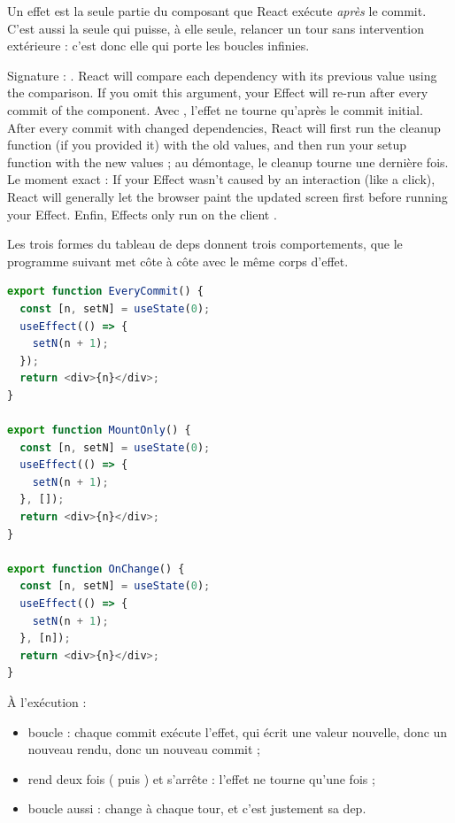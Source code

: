 Un effet est la seule partie du composant que React exécute \emph{après} le
commit. C'est aussi la seule qui puisse, à elle seule, relancer un tour sans
intervention extérieure : c'est donc elle qui porte les boucles infinies.

\begin{react}
Signature : . \og React will compare each
dependency with its previous value using the  comparison. If
you omit this argument, your Effect will re-run after every commit of the
component.\fg{} Avec \code{[]}, l'effet ne tourne qu'après le commit initial.
\og After every commit with changed dependencies, React will first run the
cleanup function (if you provided it) with the old values, and then run your
setup function with the new values\fg{} ; au démontage, le cleanup tourne une
dernière fois. Le moment exact : \og If your Effect wasn't caused by an
interaction (like a click), React will generally let the browser paint the
updated screen first before running your Effect.\fg{} Enfin, \og Effects only
run on the client\fg{} \cite{ReactDocs}.
\end{react}

Les trois formes du tableau de deps donnent trois comportements, que le
programme suivant met côte à côte avec le même corps d'effet.

\begin{lstlisting}[language=TypeScript,caption={Trois formes de deps pour le même effet (\file{/tmp/ch02/deps.tsx}, imports omis)},label={lst:react-modele-deps}]
export function EveryCommit() {
  const [n, setN] = useState(0);
  useEffect(() => {
    setN(n + 1);
  });
  return <div>{n}</div>;
}

export function MountOnly() {
  const [n, setN] = useState(0);
  useEffect(() => {
    setN(n + 1);
  }, []);
  return <div>{n}</div>;
}

export function OnChange() {
  const [n, setN] = useState(0);
  useEffect(() => {
    setN(n + 1);
  }, [n]);
  return <div>{n}</div>;
}
\end{lstlisting}

À l'exécution :
\begin{itemize}
  \item {} boucle : chaque commit exécute l'effet, qui écrit
    une valeur nouvelle, donc un nouveau rendu, donc un nouveau commit ;
  \item {} rend deux fois ( puis ) et s'arrête :
    l'effet ne tourne qu'une fois ;
  \item {} boucle aussi :  change à chaque tour, et c'est
    justement sa dep.
\end{itemize}

